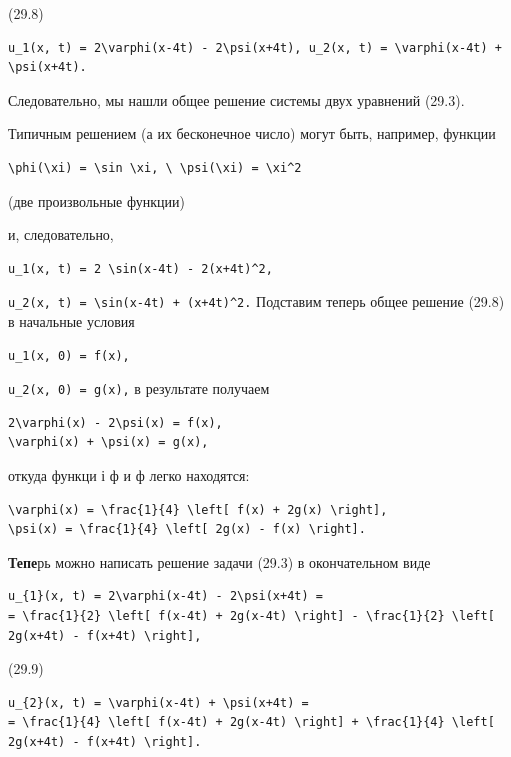\documentclass[
  ukrainian,
]{article}
\begin{document}
(29.8)

\begin{verbatim}
u_1(x, t) = 2\varphi(x-4t) - 2\psi(x+4t), u_2(x, t) = \varphi(x-4t) + \psi(x+4t).
\end{verbatim}

Следовательно, мы нашли общее решение системы двух уравнений (29.3).

Типичным решением (а их бесконечное число) могут быть, например, функции

\begin{verbatim}
\phi(\xi) = \sin \xi, \ \psi(\xi) = \xi^2
\end{verbatim}

(две произвольные функции)

и, следовательно,

\begin{verbatim}
u_1(x, t) = 2 \sin(x-4t) - 2(x+4t)^2,
\end{verbatim}

\texttt{u\_2(x,\ t)\ =\ \textbackslash{}sin(x-4t)\ +\ (x+4t)\^{}2.}
Подставим теперь общее решение (29.8) в начальные условия

\begin{verbatim}
u_1(x, 0) = f(x),
\end{verbatim}

\texttt{u\_2(x,\ 0)\ =\ g(x),} в результате получаем

\begin{verbatim}
2\varphi(x) - 2\psi(x) = f(x),
\varphi(x) + \psi(x) = g(x),
\end{verbatim}

откуда функци і ф и ф легко находятся:

\begin{verbatim}
\varphi(x) = \frac{1}{4} \left[ f(x) + 2g(x) \right],
\psi(x) = \frac{1}{4} \left[ 2g(x) - f(x) \right].
\end{verbatim}

\textbf{Тепе}рь можно написать решение задачи (29.3) в окончательном
виде

\begin{verbatim}
u_{1}(x, t) = 2\varphi(x-4t) - 2\psi(x+4t) =
= \frac{1}{2} \left[ f(x-4t) + 2g(x-4t) \right] - \frac{1}{2} \left[ 2g(x+4t) - f(x+4t) \right],
\end{verbatim}

(29.9)

\begin{verbatim}
u_{2}(x, t) = \varphi(x-4t) + \psi(x+4t) =
= \frac{1}{4} \left[ f(x-4t) + 2g(x-4t) \right] + \frac{1}{4} \left[ 2g(x+4t) - f(x+4t) \right].
\end{verbatim}
\end{document}
